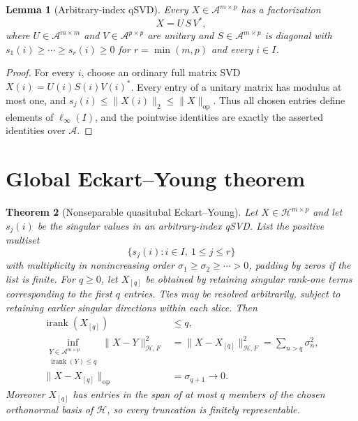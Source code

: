 \documentclass[11pt]{article}
\newtheorem{theorem}{Theorem}
\newtheorem{lemma}[theorem]{Lemma}
\newcommand{\A}{\mathcal A}
\newcommand{\Hh}{\mathcal H}
\newcommand{\irank}{\operatorname{irank}}
\begin{document}
\begin{lemma}[Arbitrary-index qSVD]
Every $X\in\A^{m\times p}$ has a factorization
\[
 X=U\,S\,V^*,
\]
where $U\in\A^{m\times m}$ and $V\in\A^{p\times p}$ are unitary and
$S\in\A^{m\times p}$ is diagonal with
$s_1(i)\ge\cdots\ge s_r(i)\ge0$ for $r=\min(m,p)$ and every $i\in I$.
\end{lemma}

\begin{proof}
For every $i$, choose an ordinary full matrix SVD
$X(i)=U(i)S(i)V(i)^*$.  Every entry of a unitary matrix has modulus at most
one, and $s_j(i)\le\|X(i)\|_2\le\|X\|_{\mathrm{op}}$.  Thus all chosen
entries define elements of $\ell_\infty(I)$, and the pointwise identities are
exactly the asserted identities over $\A$.
\end{proof}

\section{Global Eckart--Young theorem}

\begin{theorem}[Nonseparable quasitubal Eckart--Young]
Let $X\in\Hh^{m\times p}$ and let $s_j(i)$ be the singular values in an
arbitrary-index qSVD.  List the positive multiset
\[
 \{s_j(i):i\in I,\ 1\le j\le r\}
\]
with multiplicity in nonincreasing order
$\sigma_1\ge\sigma_2\ge\cdots>0$, padding by zeros if the list is finite.
For $q\ge0$, let $X_{[q]}$ be obtained by retaining singular rank-one terms
corresponding to the first $q$ entries.  Ties may be resolved arbitrarily,
subject to retaining earlier singular directions within each slice.  Then
\begin{align*}
 \irank(X_{[q]})&\le q,\\
 \inf_{\substack{Y\in\A^{m\times p}\\\irank(Y)\le q}}
 \|X-Y\|_{\Hh,F}^2
 &=\|X-X_{[q]}\|_{\Hh,F}^2
 =\sum_{n>q}\sigma_n^2,\\
 \|X-X_{[q]}\|_{\mathrm{op}}&=\sigma_{q+1}\longrightarrow0.
\end{align*}
Moreover $X_{[q]}$ has entries in the span of at most $q$ members of the
chosen orthonormal basis of $\Hh$, so every truncation is finitely
representable.
\end{theorem}
\end{document}
